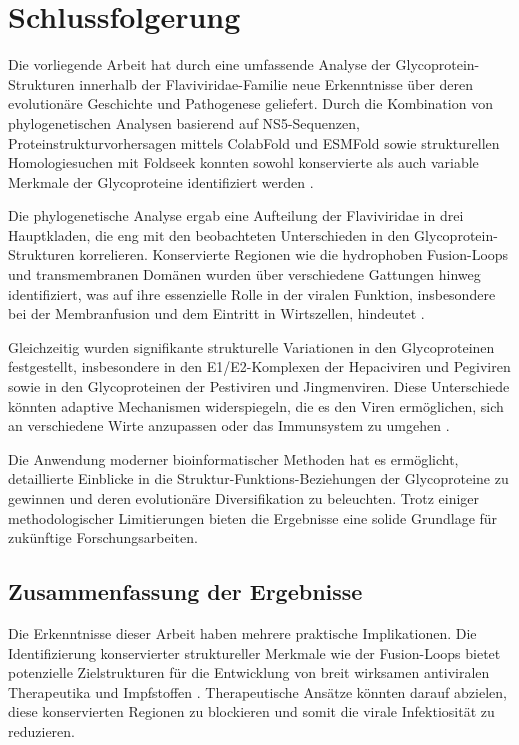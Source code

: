 \chapter{Schlussfolgerung} \label{chap:schlussfolgerung}

Die vorliegende Arbeit hat durch eine umfassende Analyse der Glycoprotein-Strukturen innerhalb der Flaviviridae-Familie neue Erkenntnisse über deren evolutionäre Geschichte und Pathogenese geliefert. Durch die Kombination von phylogenetischen Analysen basierend auf NS5-Sequenzen, Proteinstrukturvorhersagen mittels ColabFold und ESMFold sowie strukturellen Homologiesuchen mit Foldseek konnten sowohl konservierte als auch variable Merkmale der Glycoproteine identifiziert werden \autocite{mifsudMappingGlycoproteinStructure2024}.

Die phylogenetische Analyse ergab eine Aufteilung der Flaviviridae in drei Hauptkladen, die eng mit den beobachteten Unterschieden in den Glycoprotein-Strukturen korrelieren. Konservierte Regionen wie die hydrophoben Fusion-Loops und transmembranen Domänen wurden über verschiedene Gattungen hinweg identifiziert, was auf ihre essenzielle Rolle in der viralen Funktion, insbesondere bei der Membranfusion und dem Eintritt in Wirtszellen, hindeutet \autocite{Rey1995} \autocite{Modis2004}.

Gleichzeitig wurden signifikante strukturelle Variationen in den Glycoproteinen festgestellt, insbesondere in den E1/E2-Komplexen der Hepaciviren und Pegiviren sowie in den Glycoproteinen der Pestiviren und Jingmenviren. Diese Unterschiede könnten adaptive Mechanismen widerspiegeln, die es den Viren ermöglichen, sich an verschiedene Wirte anzupassen oder das Immunsystem zu umgehen \autocite{Lavie2017}.

Die Anwendung moderner bioinformatischer Methoden hat es ermöglicht, detaillierte Einblicke in die Struktur-Funktions-Beziehungen der Glycoproteine zu gewinnen und deren evolutionäre Diversifikation zu beleuchten. Trotz einiger methodologischer Limitierungen bieten die Ergebnisse eine solide Grundlage für zukünftige Forschungsarbeiten.

\section{Zusammenfassung der Ergebnisse} \label{sec:zusammenfassung-der-ergebnisse}

Die Erkenntnisse dieser Arbeit haben mehrere praktische Implikationen. Die Identifizierung konservierter struktureller Merkmale wie der Fusion-Loops bietet potenzielle Zielstrukturen für die Entwicklung von breit wirksamen antiviralen Therapeutika und Impfstoffen \autocite{Fernandez2018}. Therapeutische Ansätze könnten darauf abzielen, diese konservierten Regionen zu blockieren und somit die virale Infektiosität zu reduzieren.

